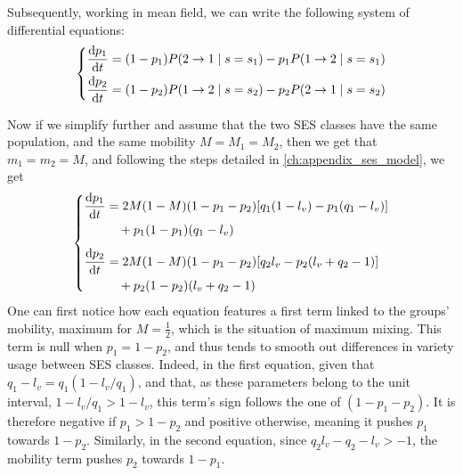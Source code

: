 \documentclass[../thesis.tex]{subfiles}
\begin{document}
Subsequently, working in mean field, we can write the following system of differential
equations:
\begin{equation}
    \label{eq:ses_ling_time_evol}
    \left\{
    \begin{aligned}
        \dv{p_1}{t} 
            &= (1 - p_1) P(2 \rightarrow 1 \mid s = s_1)
                - p_1 P(1 \rightarrow 2 \mid s = s_1)
        \\
        \dv{p_2}{t} 
            &= (1 - p_2) P(1 \rightarrow 2 \mid s = s_2)
                 - p_2 P(2 \rightarrow 1 \mid s = s_2)
    \end{aligned}
    \right.
\end{equation}

Now if we simplify further and assume that the two \ac{SES} classes have the same
population, and the same mobility $M = M_1 = M_2$, then we get that $m_1 = m_2 = M$, and
following the steps detailed in \cref{ch:appendix_ses_model}, we get
\begin{equation}
  \label{eq:ses_ling_time_evol_eq_mob}
  \left\{
  \begin{aligned}
      \dv{p_1}{t} 
          &=
            2 M (1 - M) (1 - p_1 - p_2) [q_1 (1 - l_v) - p_1 (q_1 - l_v)]
      \\
          & \quad +
            p_1 (1 - p_1) (q_1 - l_v)
      \\[1ex]
      \dv{p_2}{t} 
          &=
            2 M (1 - M) (1 - p_1 - p_2) [q_2 l_v - p_2 (l_v + q_2 - 1)]
      \\
          & \quad +
            p_2 (1 - p_2) (l_v + q_2 - 1)
  \end{aligned}
  \right.
\end{equation}
One can first notice how each equation features a first term linked to the groups'
mobility, maximum for $M = \frac{1}{2}$, which is the situation of maximum mixing. This
term is null when $p_1 = 1 - p_2$, and thus tends to smooth out differences in variety
usage between \ac{SES} classes. Indeed, in the first equation, given that $q_1 - l_v =
q_1 (1 - l_v / q_1)$, and that, as these parameters belong to the unit interval, $1 -
l_v / q_1 > 1 - l_v$, this term's sign follows the one of $(1 - p_1 - p_2)$. It is
therefore negative if $p_1 > 1 - p_2$ and positive otherwise, meaning it pushes $p_1$
towards $1 - p_2$. Similarly, in the second equation, since $q_2 l_v - q_2 - l_v > -1$,
the mobility term pushes $p_2$ towards $1 - p_1$.
\end{document}
